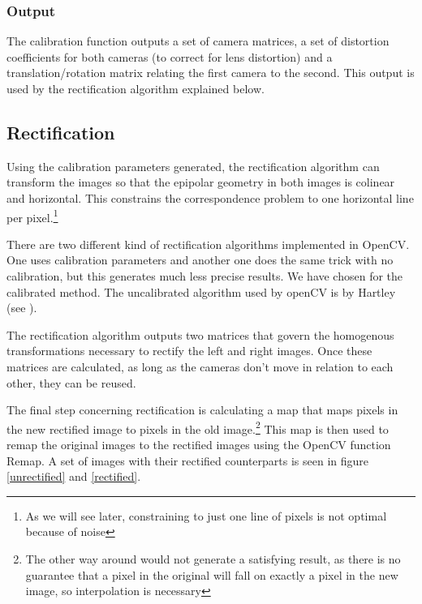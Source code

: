 \documentclass[a4paper]{article}
\begin{document}
\subsubsection{Output}
The calibration function outputs a set of camera matrices, a set of distortion coefficients for both cameras (to correct for lens distortion) and a translation/rotation matrix relating the first camera to the second. This output is used by the rectification algorithm explained below.

\subsection{Rectification}
Using the calibration parameters generated, the rectification algorithm can transform the images so that the epipolar geometry in both images is colinear and horizontal. This constrains the correspondence problem to one horizontal line per pixel.\footnote{As we will see later, constraining to just one line of pixels is not optimal because of noise}

There are two different kind of rectification algorithms implemented in OpenCV. One uses calibration parameters and another one does the same trick with no calibration, but this generates much less precise results. We have chosen for the calibrated method. The uncalibrated algorithm used by openCV is by Hartley (see \cite{Hartley99}).

The rectification algorithm outputs two matrices that govern the homogenous transformations necessary to rectify the left and right images. Once these matrices are calculated, as long as the cameras don't move in relation to each other, they can be reused.

The final step concerning rectification is calculating a map that maps pixels in the new rectified image to pixels in the old image.\footnote{The other way around would not generate a satisfying result, as there is no guarantee that a pixel in the original will fall on exactly a pixel in the new image, so interpolation is necessary} This map is then used to remap the original images to the rectified images using the OpenCV function Remap. A set of images with their rectified counterparts
is seen in figure \ref{unrectified} and \ref{rectified}.
\end{document}
